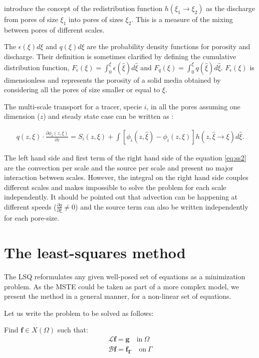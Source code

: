 \documentclass{CFD2011}
\newcommand{\TODO}[1]{\textcolor{blue}{TODO: #1} \\}
\begin{document}
\cite{DupuySchwarz} introduce the concept of the redistribution function $h(\xi_1 \rightarrow \xi_2)$ as the discharge from pores of size $\xi_1$ into pores of sizes $\xi_2$. This is a measure of the mixing between pores of different scales.

The $\epsilon(\xi)d\xi$ and $q(\xi)d\xi$ are the probability density functions for porosity and discharge. Their definition is sometimes clarified by defining the cumulative distribution function, $F_{\epsilon}(\xi)=\int_0^{\xi}\epsilon(\hat \xi)d\hat\xi$ and $F_{q}(\xi)=\int_0^{\xi}q(\hat\xi)d\hat\xi$. $F_{\epsilon}(\xi)$ is dimensionless and represents the porosity of a solid media obtained by considering all the pores of size smaller or equal to $\xi$.

The multi-scale transport for a tracer, specie $i$, in all the pores assuming one dimension ($z$) and steady state case can be written as \citep{DupuySchwarz}:

\begin{align}
q(z, \xi) \cdot \frac{\partial \phi_{i}(z, \xi)}{\partial z}  = 
 S_{i}(z, \xi) + \int [\phi_{i}(z, \hat \xi) - \phi_{i}(z, \xi)] h(z, \hat \xi \rightarrow \xi) d\hat \xi . 
\label{eq:ss2}
\end{align}

The left hand side and first term of the right hand side of the equation \ref{eq:ss2} are the convection per scale and the source per scale and present no major interaction between scales. However, the integral on the right hand side couples different scales and makes impossible to solve the problem for each scale independently. It should be pointed out that advection can be happening at different speeds ($\tfrac{\partial q}{\partial \xi} \neq 0$) and the source term can also be written independently for each pore-size.


\section{The least-squares method}
\label{sec:LSQ}
The LSQ reformulates any given well-posed set of equations as a minimization problem. As the MSTE could be taken as part of a more complex model, we present the method in a general manner, for a non-linear set of equations. 

Let us write the problem to be solved as follows: 

Find $\mathbf{f}\in X(\Omega)$ such that:
\begin{eqnarray}
\mathcal{L} \mathbf{f} = \mathbf{g} \quad \mbox{in} \ \Omega \label{eq:Problem} \\
\mathcal{B} \mathbf{f} = \mathbf{f_\Gamma} \quad \mbox{on} \ \Gamma \label{eq:Boundary}
\end{eqnarray}
\end{document}

